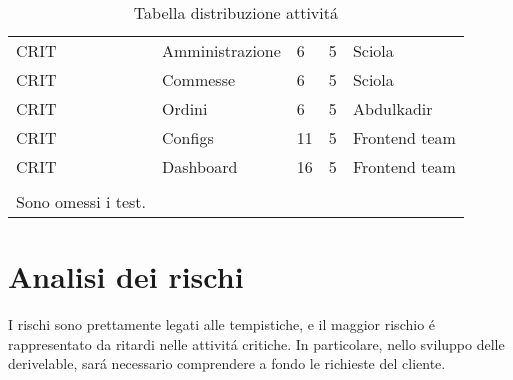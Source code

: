 \documentclass[../../documentazione.tex]{subfiles}
\begin{document}
\begin{table}[]
\begin{tabular}{lllll}
            CRIT& \multicolumn{1}{l|}{Amministrazione}  & 6                        & 5               & Sciola                                  \\
            CRIT& \multicolumn{1}{l|}{Commesse}         & 6                        & 5               & Sciola                                  \\
            CRIT& \multicolumn{1}{l|}{Ordini}           & 6                        & 5               & Abdulkadir                              \\
            CRIT& \multicolumn{1}{l|}{Configs}          & 11                       & 5               & Frontend team                           \\
           CRIT & \multicolumn{1}{l|}{Dashboard}        & 16                       & 5               & Frontend team                           \\
            &                                       &                          &                 &                                         \\
            Sono omessi i test.                     &                                       &                          &                 &
        \end{tabular}
        \caption{Tabella distribuzione attivitá}
    \end{table}

    \section{Analisi dei rischi}\label{sec:analisi-dei-rischi}
    I rischi sono prettamente legati alle tempistiche, e il maggior rischio é rappresentato da ritardi nelle attivitá critiche.
    In particolare, nello sviluppo delle derivelable, sará necessario comprendere a fondo le richieste del cliente.
\end{document}
